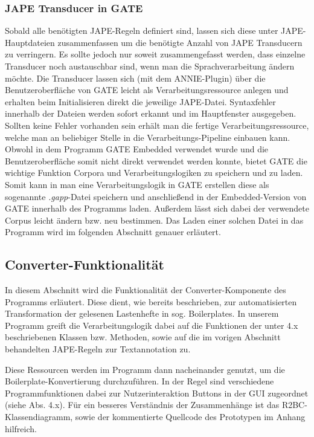 \documentclass[12pt]{report}
\begin{document}
\subsubsection{JAPE Transducer in GATE}

Sobald alle benötigten JAPE-Regeln definiert sind, lassen sich diese unter JAPE-Hauptdateien zusammenfassen um die benötigte Anzahl von JAPE Transducern zu verringern. Es sollte jedoch nur soweit zusammengefasst werden, dass einzelne Transducer noch austauschbar sind, wenn man die Sprachverarbeitung ändern möchte. 
Die Transducer lassen sich (mit dem ANNIE-Plugin) über die Benutzeroberfläche von GATE leicht als Verarbeitungsressource anlegen und erhalten beim Initialisieren direkt die jeweilige JAPE-Datei. Syntaxfehler innerhalb der Dateien werden sofort erkannt und im Hauptfenster ausgegeben. 
Sollten keine Fehler vorhanden sein erhält man die fertige Verarbeitungsressource, welche man an beliebiger Stelle in die Verarbeitungs-Pipeline einbauen kann.
Obwohl in dem Programm GATE Embedded verwendet wurde und die Benutzeroberfläche somit nicht direkt verwendet werden konnte, bietet GATE die wichtige Funktion Corpora und Verarbeitungslogiken zu speichern und zu laden. Somit kann in man eine Verarbeitungslogik in GATE erstellen diese als sogenannte \textit{.gapp}-Datei speichern und anschließend in der Embedded-Version von GATE innerhalb des Programms laden. Außerdem lässt sich dabei der verwendete Corpus leicht ändern bzw. neu bestimmen. Das Laden einer solchen Datei in das Programm wird im folgenden Abschnitt genauer erläutert. 

\subsection{Converter-Funktionalität}
In diesem Abschnitt wird die Funktionalität der Converter-Komponente des Programms erläutert. Diese dient, wie bereits beschrieben, zur automatisierten Transformation der gelesenen Lastenhefte in sog. Boilerplates. In unserem Programm greift die Verarbeitungslogik dabei auf die Funktionen der unter 4.x beschriebenen Klassen bzw. Methoden, sowie auf die im vorigen Abschnitt behandelten JAPE-Regeln zur Textannotation zu. 

Diese Ressourcen werden im Programm dann nacheinander genutzt, um die Boilerplate-Konvertierung durchzuführen. In der Regel sind verschiedene Programmfunktionen dabei zur Nutzerinteraktion Buttons in der GUI zugeordnet (siehe Abs. 4.x). Für ein besseres Verständnis der Zusammenhänge ist das R2BC-Klassendiagramm, sowie der kommentierte Quellcode des Prototypen im Anhang hilfreich.
\end{document}

